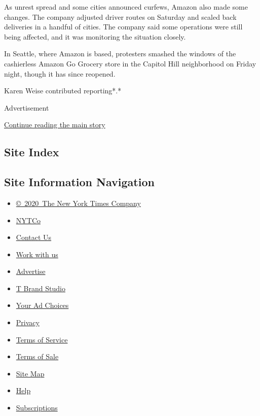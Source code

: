 As unrest spread and some cities announced curfews, Amazon also made
some changes. The company adjusted driver routes on Saturday and scaled
back deliveries in a handful of cities. The company said some operations
were still being affected, and it was monitoring the situation closely.

In Seattle, where Amazon is based, protesters smashed the windows of the
cashierless Amazon Go Grocery store in the Capitol Hill neighborhood on
Friday night, though it has since reopened.

Karen Weise contributed reporting*.*

Advertisement

\protect\hyperlink{after-bottom}{Continue reading the main story}

\hypertarget{site-index}{%
\subsection{Site Index}\label{site-index}}

\hypertarget{site-information-navigation}{%
\subsection{Site Information
Navigation}\label{site-information-navigation}}

\begin{itemize}
\tightlist
\item
  \href{https://help.nytimes.com/hc/en-us/articles/115014792127-Copyright-notice}{©~2020~The
  New York Times Company}
\end{itemize}

\begin{itemize}
\tightlist
\item
  \href{https://www.nytco.com/}{NYTCo}
\item
  \href{https://help.nytimes.com/hc/en-us/articles/115015385887-Contact-Us}{Contact
  Us}
\item
  \href{https://www.nytco.com/careers/}{Work with us}
\item
  \href{https://nytmediakit.com/}{Advertise}
\item
  \href{http://www.tbrandstudio.com/}{T Brand Studio}
\item
  \href{https://www.nytimes.com/privacy/cookie-policy\#how-do-i-manage-trackers}{Your
  Ad Choices}
\item
  \href{https://www.nytimes.com/privacy}{Privacy}
\item
  \href{https://help.nytimes.com/hc/en-us/articles/115014893428-Terms-of-service}{Terms
  of Service}
\item
  \href{https://help.nytimes.com/hc/en-us/articles/115014893968-Terms-of-sale}{Terms
  of Sale}
\item
  \href{https://spiderbites.nytimes.com}{Site Map}
\item
  \href{https://help.nytimes.com/hc/en-us}{Help}
\item
  \href{https://www.nytimes.com/subscription?campaignId=37WXW}{Subscriptions}
\end{itemize}
